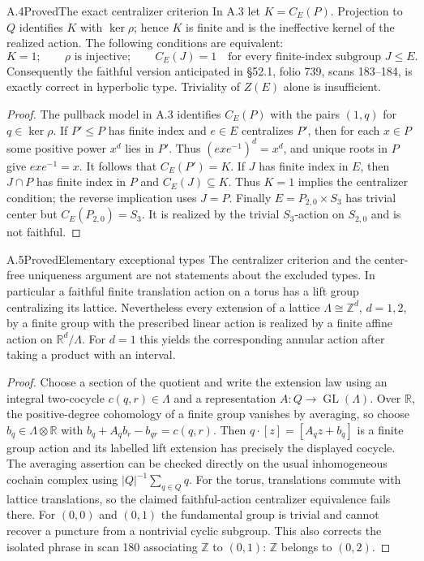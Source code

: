 \begin{statement}{A.4}{Proved}{The exact centralizer criterion}
In A.3 let $K=C_E(P)$. Projection to $Q$ identifies $K$ with
$\ker\rho$; hence $K$ is finite and is the ineffective kernel of the
realized action. The following conditions are equivalent:
\[
 K=1;\qquad \rho\text{ is injective};\qquad
 C_E(J)=1\quad\text{for every finite-index subgroup }J\leq E.
\]
Consequently the faithful version anticipated in \S52.1, folio 739,
scans 183--184, is exactly correct in hyperbolic type. Triviality of
$Z(E)$ alone is insufficient.
\end{statement}
\begin{proof}
The pullback model in A.3 identifies $C_E(P)$ with the pairs $(1,q)$
for $q\in\ker\rho$. If $P'\leq P$ has finite index and
$e\in E$ centralizes $P'$, then for each $x\in P$ some positive
power $x^d$ lies in $P'$. Thus
$(exe^{-1})^d=x^d$, and unique roots in $P$ give $exe^{-1}=x$.
It follows that $C_E(P')=K$. If $J$ has finite index in $E$, then
$J\cap P$ has finite index in $P$ and $C_E(J)\subseteq K$.
Thus $K=1$ implies the centralizer condition; the reverse implication
uses $J=P$. Finally $E=P_{2,0}\times S_3$ has trivial center but
$C_E(P_{2,0})=S_3$. It is realized by the trivial $S_3$-action on
$S_{2,0}$ and is not faithful.
\end{proof}

\begin{statement}{A.5}{Proved}{Elementary exceptional types}
The centralizer criterion and the center-free uniqueness argument are
not statements about the excluded types. In particular a faithful
finite translation action on a torus has a lift group centralizing
its lattice. Nevertheless every extension of a lattice
$\Lambda\cong\mathbb Z^d$, $d=1,2$, by a finite group with the
prescribed linear action is realized by a finite affine action on
$\mathbb R^d/\Lambda$. For $d=1$ this yields the corresponding
annular action after taking a product with an interval.
\end{statement}
\begin{proof}
Choose a section of the quotient and write the extension law using
an integral two-cocycle $c(q,r)\in\Lambda$ and a representation
$A:Q\to\operatorname{GL}(\Lambda)$. Over $\mathbb R$, the
positive-degree cohomology of a finite group vanishes by averaging,
so choose $b_q\in\Lambda\otimes\mathbb R$ with
$b_q+A_qb_r-b_{qr}=c(q,r)$. Then
$q\cdot[z]=[A_qz+b_q]$ is a finite group action and its labelled
lift extension has precisely the displayed cocycle. The averaging
assertion can be checked directly on the usual inhomogeneous
cochain complex using $|Q|^{-1}\sum_{q\in Q}q$.
For the torus, translations commute with lattice translations, so
the claimed faithful-action centralizer equivalence fails there.
For $(0,0)$ and $(0,1)$ the fundamental group is trivial and cannot
recover a puncture from a nontrivial cyclic subgroup. This also
corrects the isolated phrase in scan 180 associating $\mathbb Z$
to $(0,1)$: $\mathbb Z$ belongs to $(0,2)$.
\end{proof}

